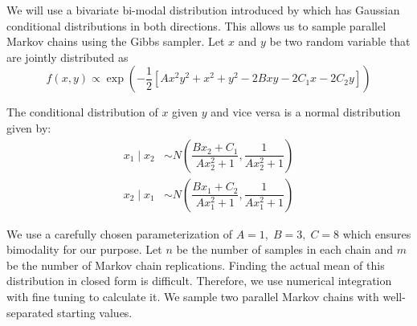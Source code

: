 \documentclass[11pt]{article}
\theoremstyle{remark}
\begin{document}
We will use a bivariate bi-modal distribution introduced by \cite{gelman1991note} which has Gaussian conditional distributions in both directions. This allows us to sample parallel Markov chains using the Gibbs sampler. Let $x$ and $y$ be two random variable that are jointly distributed as 
%
\[
f(x, y) \propto \exp\left(-\dfrac{1}{2}[Ax^2y^2 + x^2 + y^2 -2Bxy  -2C_1x - 2C_2y]\right)
\]

The conditional distribution of $x$ given $y$ and vice versa is a normal distribution given by:
%
\begin{align*}
    x_1 \mid x_2 &\sim N\left(\dfrac{Bx_2 + C_1}{Ax_2^2 + 1}, \dfrac{1}{Ax_2^2 + 1}\right)\\
    x_2 \mid x_1 &\sim N\left(\dfrac{Bx_1 + C_2}{Ax_1^2 + 1}, \dfrac{1}{Ax_1^2 + 1}\right)
\end{align*}

We use a carefully chosen parameterization of $A = 1,\; B = 3,\; C = 8$ which ensures bimodality for our purpose.  Let $n$ be the number of samples in each chain and $m$ be the number of Markov chain replications. Finding the actual mean of this distribution in closed form is difficult. Therefore, we use numerical integration with fine tuning to calculate it. We sample two parallel Markov chains with well-separated starting values. 
\end{document}
